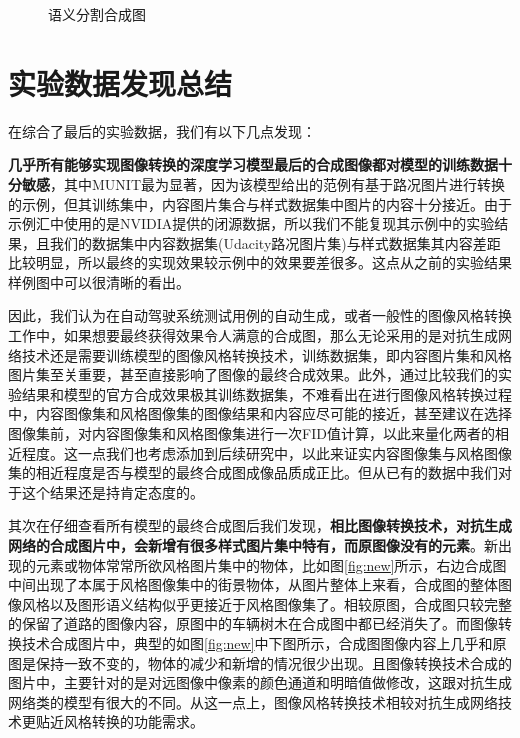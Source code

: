 \begin{figure}[h]
    \centering
    \caption{语义分割合成图}
    \label{fig:seg}
\end{figure}


\section{实验数据发现总结}

在综合了最后的实验数据，我们有以下几点发现：

\textbf{几乎所有能够实现图像转换的深度学习模型最后的合成图像都对模型的训练数据十分敏感}，其中MUNIT最为显著，因为该模型给出的范例有基于路况图片进行转换的示例，但其训练集中，内容图片集合与样式数据集中图片的内容十分接近。由于示例汇中使用的是NVIDIA提供的闭源数据，所以我们不能复现其示例中的实验结果，且我们的数据集中内容数据集(Udacity路况图片集)与样式数据集其内容差距比较明显，所以最终的实现效果较示例中的效果要差很多。这点从之前的实验结果样例图中可以很清晰的看出。

因此，我们认为在自动驾驶系统测试用例的自动生成，或者一般性的图像风格转换工作中，如果想要最终获得效果令人满意的合成图，那么无论采用的是对抗生成网络技术还是需要训练模型的图像风格转换技术，训练数据集，即内容图片集和风格图片集至关重要，甚至直接影响了图像的最终合成效果。此外，通过比较我们的实验结果和模型的官方合成效果极其训练数据集，不难看出在进行图像风格转换过程中，内容图像集和风格图像集的图像结果和内容应尽可能的接近，甚至建议在选择图像集前，对内容图像集和风格图像集进行一次FID值计算，以此来量化两者的相近程度。这一点我们也考虑添加到后续研究中，以此来证实内容图像集与风格图像集的相近程度是否与模型的最终合成图成像品质成正比。但从已有的数据中我们对于这个结果还是持肯定态度的。

其次在仔细查看所有模型的最终合成图后我们发现，\textbf{相比图像转换技术，对抗生成网络的合成图片中，会新增有很多样式图片集中特有，而原图像没有的元素}。新出现的元素或物体常常所欲风格图片集中的物体，比如图\ref{fig:new}所示，右边合成图中间出现了本属于风格图像集中的街景物体，从图片整体上来看，合成图的整体图像风格以及图形语义结构似乎更接近于风格图像集了。相较原图，合成图只较完整的保留了道路的图像内容，原图中的车辆树木在合成图中都已经消失了。而图像转换技术合成图片中，典型的如图\ref{fig:new}中下图所示，合成图图像内容上几乎和原图是保持一致不变的，物体的减少和新增的情况很少出现。且图像转换技术合成的图片中，主要针对的是对远图像中像素的颜色通道和明暗值做修改，这跟对抗生成网络类的模型有很大的不同。从这一点上，图像风格转换技术相较对抗生成网络技术更贴近风格转换的功能需求。

